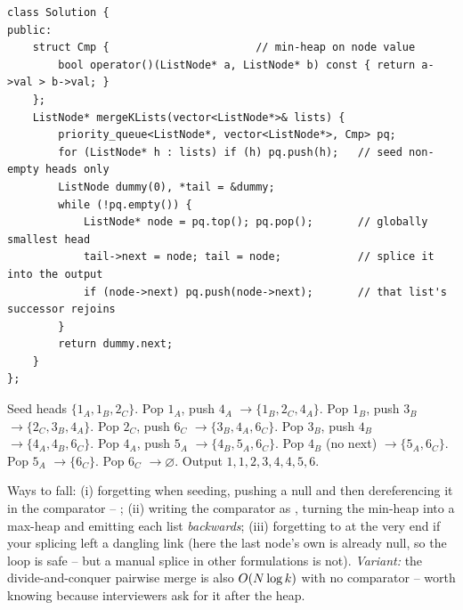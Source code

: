 \begin{lstlisting}[caption={Merge k Sorted Lists -- min-heap of live list heads (LeetCode 23)}, label={lst:c07-mergek-soln}]
class Solution {
public:
    struct Cmp {                       // min-heap on node value
        bool operator()(ListNode* a, ListNode* b) const { return a->val > b->val; }
    };
    ListNode* mergeKLists(vector<ListNode*>& lists) {
        priority_queue<ListNode*, vector<ListNode*>, Cmp> pq;
        for (ListNode* h : lists) if (h) pq.push(h);   // seed non-empty heads only
        ListNode dummy(0), *tail = &dummy;
        while (!pq.empty()) {
            ListNode* node = pq.top(); pq.pop();       // globally smallest head
            tail->next = node; tail = node;            // splice it into the output
            if (node->next) pq.push(node->next);       // that list's successor rejoins
        }
        return dummy.next;
    }
};
\end{lstlisting}

\begin{tracebox}
Seed heads $\{1_A,1_B,2_C\}$. Pop $1_A$, push $4_A$ $\to\{1_B,2_C,4_A\}$. Pop $1_B$, push $3_B$
$\to\{2_C,3_B,4_A\}$. Pop $2_C$, push $6_C$ $\to\{3_B,4_A,6_C\}$. Pop $3_B$, push $4_B$
$\to\{4_A,4_B,6_C\}$. Pop $4_A$, push $5_A$ $\to\{4_B,5_A,6_C\}$. Pop $4_B$ (no next) $\to\{5_A,6_C\}$.
Pop $5_A$ $\to\{6_C\}$. Pop $6_C$ $\to\varnothing$. Output $1,1,2,3,4,4,5,6$. \checkmark
\end{tracebox}


\begin{warningbox}
Ways to fall: (i) forgetting  when seeding, pushing a null and then dereferencing it in the
comparator -- \re; (ii) writing the comparator as , turning the min-heap into a
max-heap and emitting each list \emph{backwards}; (iii) forgetting to  at the very
end if your splicing left a dangling link (here the last node's own  is already null, so the loop
is safe -- but a manual splice in other formulations is not). \emph{Variant:} the divide-and-conquer pairwise
merge is also $O(N\log k)$ with no comparator -- worth knowing because interviewers ask for it after the
heap.
\end{warningbox}

